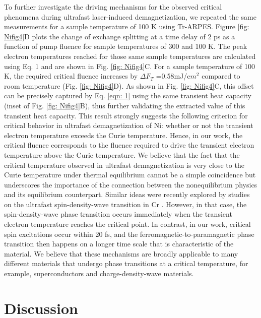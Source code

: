 To further investigate the driving mechanisms for the observed critical phenomena during ultrafast laser-induced demagnetization, we repeated the same measurements for a sample temperature of 100 K using Tr-ARPES. Figure \ref{fig: Nifig4}D plots the change of exchange splitting at a time delay of 2 ps as a function of pump fluence for sample temperatures of 300 and 100 K. The peak electron temperatures reached for those same sample temperatures are calculated using Eq. 1 and are shown in Fig. \ref{fig: Nifig4}C. For a sample temperature of 100 K, the required critical fluence increases by $\Delta F_{T}$ =0.58mJ/c$m^2$ compared to room temperature (Fig. \ref{fig: Nifig4}D). As shown in Fig. \ref{fig: Nifig4}C, this offset can be precisely captured by Eq. \ref{eqn: 1} using the same transient heat capacity (inset of Fig. \ref{fig: Nifig4}B), thus further validating the extracted value of this transient heat capacity. This result strongly suggests the following criterion for critical behavior in ultrafast demagnetization of Ni: whether or not the transient electron temperature exceeds the Curie temperature. Hence, in our work, the critical fluence corresponds to the fluence required to drive the transient electron temperature above the Curie temperature. We believe that the fact that the critical temperature observed in ultrafast demagnetization is very close to the Curie temperature under thermal equilibrium cannot be a simple coincidence but underscores the importance of the connection between the nonequilibrium physics and its equilibrium counterpart. Similar ideas were recently explored by studies on the ultrafast spin-density-wave transition in Cr \cite{Nicholson2016}. However, in that case, the spin-density-wave phase transition occurs immediately when the transient electron temperature reaches the critical point. In contrast, in our work, critical spin excitations occur within 20 fs, and the ferromagnetic-to-paramagnetic phase transition then happens on a longer time scale that is characteristic of the material. We believe that these mechanisms are broadly applicable to many different materials that undergo phase transitions at a critical temperature, for example, superconductors and charge-density-wave materials.

\section{Discussion}

